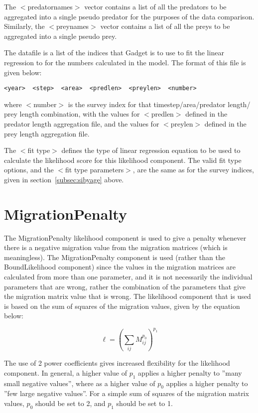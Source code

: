 \documentclass [a4paper, 10pt]{book}
\begin{document}
The $<$predatornames$>$ vector contains a list of all the predators to be aggregated into a single pseudo predator for the purposes of the data comparison.  Similarly, the $<$preynames$>$ vector contains a list of all the preys to be aggregated into a single pseudo prey.

\bigskip
The datafile is a list of the indices that Gadget is to use to fit the linear regression to for the numbers calculated in the model.  The format of this file is given below:

{\small\begin{verbatim}
<year>  <step>  <area>  <predlen>  <preylen>  <number>
\end{verbatim}}

where $<$number$>$ is the survey index for that timestep/area/predator length/ prey length combination, with the values for $<$predlen$>$ defined in the predator length aggregation file, and the values for $<$preylen$>$ defined in the prey length aggregation file.

\bigskip
The $<$fit type$>$ defines the type of linear regression equation to be used to calculate the likelihood score for this likelihood component.  The valid fit type options, and the $<$fit type parameters$>$, are the same as for the survey indices, given in section~\ref{subsec:sibyage} above.

\section{MigrationPenalty}\label{sec:migpenalty}
The MigrationPenalty likelihood component is used to give a penalty whenever there is a negative migration value from the migration matrices (which is meaningless).  The MigrationPenalty component is used (rather than the BoundLikelihood component) since the values in the migration matrices are calculated from more than one parameter, and it is not necessarily the individual parameters that are wrong, rather the combination of the parameters that give the migration matrix value that is wrong.  The likelihood component that is used is based on the sum of squares of the migration values, given by the equation below:

\begin{equation}\label{eq:migpenalty}
\ell = \left( \sum_{ij}^{} M_{ij}^{p_0} \right)^{p_1}
\end{equation}

\bigskip
The use of 2 power coefficients gives increased flexibility for the likelihood component.  In general, a higher value of $p_1$ applies a higher penalty to ''many small negative values'', where as a higher value of $p_0$ applies a higher penalty to ''few large negative values''.  For a simple sum of squares of the migration matrix values, $p_0$ should be set to 2, and $p_1$ should be set to 1.
\end{document}
